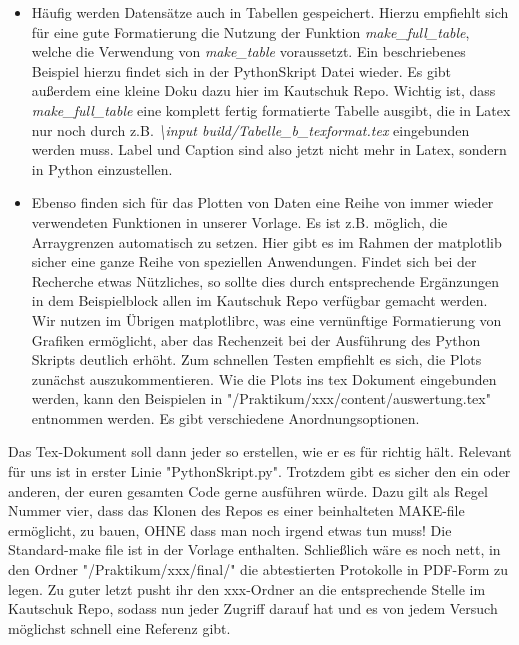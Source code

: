\begin{itemize}
  \item Häufig werden Datensätze auch in Tabellen gespeichert. Hierzu empfiehlt sich für eine gute Formatierung die Nutzung der Funktion \emph{make\_full\_table}, welche die Verwendung von \emph{make\_table} voraussetzt. Ein beschriebenes Beispiel hierzu findet sich in der PythonSkript Datei wieder. Es gibt außerdem eine kleine Doku dazu hier im Kautschuk Repo. Wichtig ist, dass \emph{make\_full\_table} eine komplett fertig formatierte Tabelle ausgibt, die in Latex nur noch durch z.B. \emph{\textbackslash input build/Tabelle\_b\_texformat.tex} eingebunden werden muss. Label und Caption sind also jetzt nicht mehr in Latex, sondern in Python einzustellen.
  \item Ebenso finden sich für das Plotten von Daten eine Reihe von immer wieder verwendeten Funktionen in unserer Vorlage. Es ist z.B. möglich, die Arraygrenzen automatisch zu setzen. Hier gibt es im Rahmen der matplotlib sicher eine ganze Reihe von speziellen Anwendungen. Findet sich bei der Recherche etwas Nützliches, so sollte dies durch entsprechende Ergänzungen in dem Beispielblock allen im Kautschuk Repo verfügbar gemacht werden. Wir nutzen im Übrigen matplotlibrc, was eine vernünftige Formatierung von Grafiken ermöglicht, aber das Rechenzeit bei der Ausführung des Python Skripts deutlich erhöht. Zum schnellen Testen empfiehlt es sich, die Plots zunächst auszukommentieren. Wie die Plots ins tex Dokument eingebunden werden, kann den Beispielen in "/Praktikum/xxx/content/auswertung.tex" entnommen werden. Es gibt verschiedene Anordnungsoptionen.
\end{itemize}
Das Tex-Dokument soll dann jeder so erstellen, wie er es für richtig hält. Relevant für uns ist in erster Linie "PythonSkript.py". Trotzdem gibt es sicher den ein oder anderen, der euren gesamten Code gerne ausführen würde. Dazu gilt als Regel Nummer vier, dass das Klonen des Repos es einer beinhalteten MAKE-file ermöglicht, zu bauen, OHNE dass man noch irgend etwas tun muss! Die Standard-make file ist in der Vorlage enthalten. Schließlich wäre es noch nett, in den Ordner "/Praktikum/xxx/final/" die abtestierten Protokolle in PDF-Form zu legen. Zu guter letzt pusht ihr den xxx-Ordner an die entsprechende Stelle im Kautschuk Repo, sodass nun jeder Zugriff darauf hat und es von jedem Versuch möglichst schnell eine Referenz gibt.
